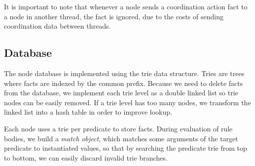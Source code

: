 It is important to note that whenever a node sends a coordination action fact to a node in another thread, the fact is ignored, due to the costs of sending
coordination data between threads.

\subsection{Database}

The node database is implemented using the trie data structure. Tries are trees where facts are indexed
by the common prefix. Because we need to delete facts from the database, we implement each trie level
as a double linked list so trie nodes can be easily removed. If a trie level has too many nodes, we
transform the linked list into a hash table in order to improve lookup.

Each node uses a trie per predicate to store facts. During evaluation of rule bodies, we build a
\emph{match object}, which matches some arguments of the target predicate to instantiated values, so
that by searching the predicate trie from top to bottom, we can easily discard invalid trie branches.
